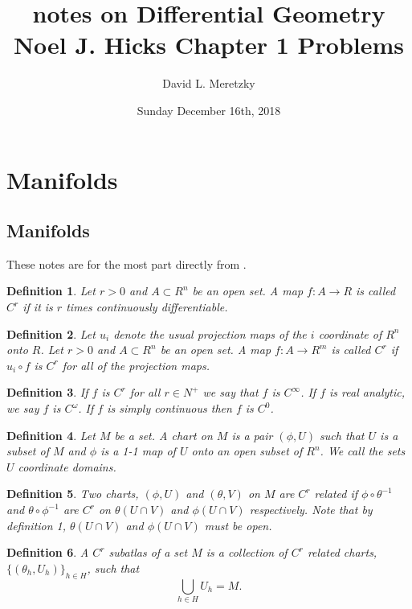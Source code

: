 \documentclass{article}
\title{ \vspace{-10ex} %
notes on Differential Geometry\\
Noel J. Hicks
Chapter 1 Problems
}
\author{David L. Meretzky
}
\date{%
Sunday December 16th, 2018
}
\theoremstyle{problemstyle}
\theoremstyle{problemstyle}
\theoremstyle{problemstyle}
\newtheorem{definition}{Definition}
\theoremstyle{problemstyle}
\theoremstyle{problemstyle}
\theoremstyle{problemstyle}
\begin{document}
\maketitle

\section{Manifolds}

\subsection{Manifolds}

These notes are for the most part directly from \cite{Hicks65}. 

\begin{definition}
Let $r > 0$ and $A \subset R^n$ be an open set. A map $f:A \rightarrow R$ is called $C^r$ if it is $r$ times continuously differentiable.   
\end{definition}

\begin{definition}\label{projection}
Let $u_i$ denote the usual projection maps of the $i$ coordinate of $R^n$ onto $R$.  Let $r > 0$ and $A \subset R^n$ be an open set. A map $f:A \rightarrow R^m$ is called $C^r$ if $u_i \circ f$ is $C^r$ for all of the projection maps.  
\end{definition}

\begin{definition}
If $f$ is $C^r$ for all $r \in N^+$ we say that $f$ is $C^\infty$. If $f$ is real analytic, we say $f$ is $C^\omega$. If $f$ is simply continuous then $f$ is $C^0$.  
\end{definition}

\begin{definition}\label{chart}
Let $M$ be a set. A chart on $M$ is a pair $(\phi,U)$ such that $U$ is a subset of $M$ and $\phi$ is a 1-1 map of $U$ onto an open subset of $R^n$. We call the sets $U$ coordinate domains. 
\end{definition}

\begin{definition}
Two charts, $(\phi,U)$ and $(\theta,V)$ on $M$ are $C^r$ related if $\phi \circ \theta^{-1}$ and $\theta \circ \phi^{-1}$ are $C^r$ on $\theta(U \cap V)$ and $\phi(U \cap V)$ respectively. Note that by definition 1, $\theta(U \cap V)$ and $\phi(U \cap V)$ must be open. 
\end{definition}

\begin{definition}\label{subatlas}
A $C^r$ subatlas of a set $M$ is a collection of $C^r$ related charts, $\{(\theta_h,U_h)\}_{h \in H}$, such that $$\bigcup_{h \in H}U_h = M.$$
\end{definition}
\end{document}
